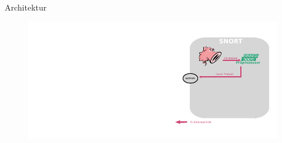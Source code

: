 \begin{frame}{Architektur}
    \begin{figure}
    	\centering
    	\includegraphics[width=\textwidth]{./images/3.pdf}
    \end{figure}
\end{frame}
